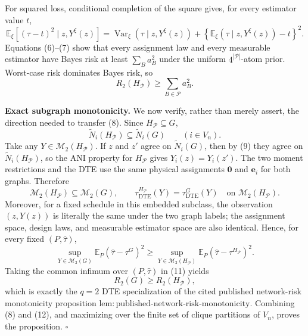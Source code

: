 For squared loss, conditional completion of the square gives, for every estimator value \(t\),
\[
\mathbb E_{\xi}\!\left[(\tau-t)^2\mid z,Y^{\xi}(z)\right]
=\operatorname{Var}_{\xi}(\tau\mid z,Y^{\xi}(z))
+\left\{\mathbb E_{\xi}(\tau\mid z,Y^{\xi}(z))-t\right\}^2.
\tag{7}
\]
Equations (6)--(7) show that every assignment law and every measurable estimator have Bayes risk at least \(\sum_Ba_B^2\) under the uniform \(4^{|\mathcal P|}\)-atom prior. Worst-case risk dominates Bayes risk, so
\[
R_2(H_{\mathcal P})\geq\sum_{B\in\mathcal P}a_B^2.
\tag{8}
\]

\textbf{Exact subgraph monotonicity.}
We now verify, rather than merely assert, the direction needed to transfer (8). Since \(H_{\mathcal P}\subseteq G\),
\[
\widetilde N_i(H_{\mathcal P})\subseteq\widetilde N_i(G)
\qquad(i\in V_n).
\tag{9}
\]
Take any \(Y\in\mathcal M_2(H_{\mathcal P})\). If \(z\) and \(z'\) agree on \(\widetilde N_i(G)\), then by (9) they agree on \(\widetilde N_i(H_{\mathcal P})\), so the ANI property for \(H_{\mathcal P}\) gives \(Y_i(z)=Y_i(z')\). The two moment restrictions and the DTE use the same physical assignments \(\mathbf0\) and \(\mathbf e_i\) for both graphs. Therefore
\[
\mathcal M_2(H_{\mathcal P})\subseteq\mathcal M_2(G),
\qquad
\tau_{\mathrm{DTE}}^{H_{\mathcal P}}(Y)
=\tau_{\mathrm{DTE}}^G(Y)
\quad\text{on }\mathcal M_2(H_{\mathcal P}).
\tag{10}
\]
Moreover, for a fixed schedule in this embedded subclass, the observation \((z,Y(z))\) is literally the same under the two graph labels; the assignment space, design laws, and measurable estimator space are also identical. Hence, for every fixed \((P,\widehat\tau)\),
\[
\sup_{Y\in\mathcal M_2(G)}\mathbb E_P(\widehat\tau-\tau^G)^2
\geq
\sup_{Y\in\mathcal M_2(H_{\mathcal P})}
\mathbb E_P(\widehat\tau-\tau^{H_{\mathcal P}})^2.
\tag{11}
\]
Taking the common infimum over \((P,\widehat\tau)\) in (11) yields
\[
R_2(G)\geq R_2(H_{\mathcal P}),
\tag{12}
\]
which is exactly the \(q=2\) DTE specialization of the cited published network-risk monotonicity proposition \(\mathrm{lem{:}published\text{-}network\text{-}risk\text{-}monotonicity}\). Combining (8) and (12), and maximizing over the finite set of clique partitions of \(V_n\), proves the proposition. \(\square\)